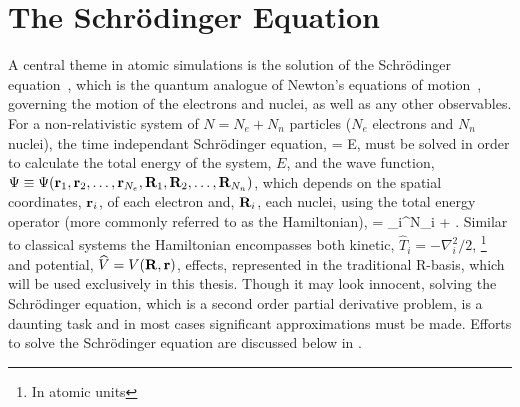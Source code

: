\section{The Schr\"odinger Equation}
\label{sec:schrodinger}

A central theme in atomic simulations is the solution of the Schr\"odinger equation~\cite{schrodinger-equation-1926}, which is the quantum analogue of Newton's equations of motion~\cite{newton-latin}, governing the motion of the electrons and nuclei, as well as any other observables.
For a non-relativistic system of $N = N_e + N_n$ particles ($N_e$ electrons and $N_n$ nuclei), the time independant Schr\"odinger equation, %
 \Psi = E\Psi,
\eeq
must be solved in order to calculate the total energy of the system, $E$, and the wave function, $\Psi \equiv \Psi({\mathrm{\mathbf{\bm{r}}}}_1, {\mathrm{\mathbf{\bm{r}}}}_2, \ldots, {\mathrm{\mathbf{\bm{r}}}}_{N_e}, {\mathrm{\mathbf{\bm{R}}}}_1, {\mathrm{\mathbf{\bm{R}}}}_2, \ldots, {\mathrm{\mathbf{\bm{R}}}}_{N_n})$, which depends on the spatial coordinates, ${\mathrm{\mathbf{\bm{r}}}}_i$, of each electron and, ${\mathrm{\mathbf{\bm{R}}}}_i$, each nuclei, using the total energy operator (more commonly referred to as the Hamiltonian),
 = \sum_i^{N}_i  + .
\eeq
Similar to classical systems the Hamiltonian encompasses both kinetic, $\widehat{T}_i = -\nabla_i^2/2$, \footnote{In atomic units} and potential, $\widehat{V} = V({\mathrm{\mathbf{\bm{R}}}}, {\mathrm{\mathbf{\bm{r}}}})$, effects, represented in the traditional R-basis, which will be used exclusively in this thesis.
Though it may look innocent, solving the Schr\"odinger equation, which is a second order partial derivative problem, is a daunting task and in most cases significant approximations must be made.
Efforts to solve the Schr\"odinger equation are discussed below in .
